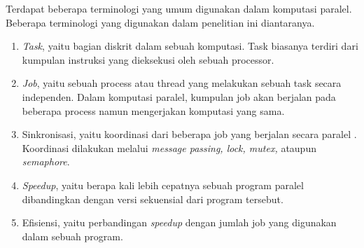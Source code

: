   Terdapat beberapa terminologi yang umum digunakan dalam komputasi paralel. Beberapa terminologi yang digunakan dalam penelitian ini diantaranya.
  \begin{enumerate}[label=\roman*.]
    \item \textit{Task}, yaitu bagian diskrit dalam sebuah komputasi. Task biasanya terdiri dari kumpulan instruksi yang dieksekusi oleh sebuah processor.  \citep{intro_parallel_llnl}
    \item \textit{Job}, yaitu sebuah process atau thread yang melakukan sebuah task secara independen. Dalam komputasi paralel, kumpulan job akan berjalan pada beberapa process namun mengerjakan komputasi yang sama. \citep{glossary_udel}
    \item Sinkronisasi, yaitu koordinasi dari beberapa job yang berjalan secara paralel \citep{intro_parallel_llnl}. Koordinasi dilakukan melalui \textit{message passing, lock, mutex,} ataupun \textit{semaphore}.
    \item \textit{Speedup}, yaitu berapa kali lebih cepatnya sebuah program paralel dibandingkan dengan versi sekuensial dari program tersebut. \citep{glossary_ufl}
    \item Efisiensi, yaitu perbandingan \textit{speedup} dengan jumlah job yang digunakan dalam sebuah program.

  \end{enumerate}


